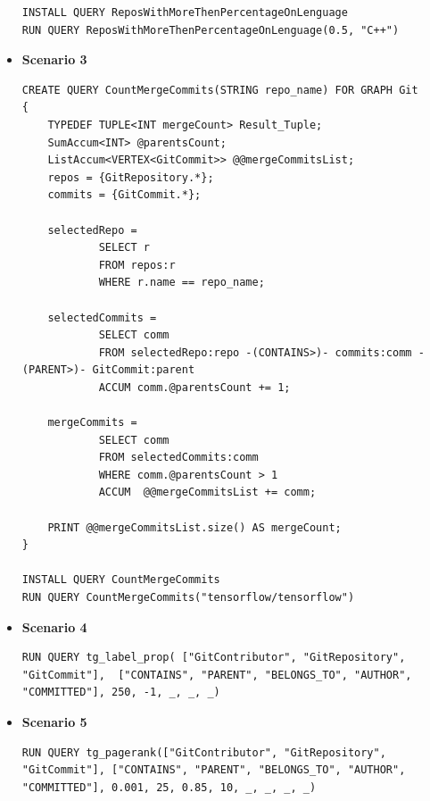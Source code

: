 \documentclass[11pt]{article}
\begin{document}
\begin{itemize}
\begin{lstlisting}[style = all, style=GSQLStyle]
INSTALL QUERY ReposWithMoreThenPercentageOnLenguage
RUN QUERY ReposWithMoreThenPercentageOnLenguage(0.5, "C++")
\end{lstlisting}
    \item \textbf{Scenario 3}
\begin{lstlisting}[style = all, style=GSQLStyle] 
CREATE QUERY CountMergeCommits(STRING repo_name) FOR GRAPH Git
{
    TYPEDEF TUPLE<INT mergeCount> Result_Tuple;
    SumAccum<INT> @parentsCount;
    ListAccum<VERTEX<GitCommit>> @@mergeCommitsList;
    repos = {GitRepository.*};
    commits = {GitCommit.*};

    selectedRepo =  
            SELECT r 
            FROM repos:r 
            WHERE r.name == repo_name;

    selectedCommits =   
            SELECT comm
            FROM selectedRepo:repo -(CONTAINS>)- commits:comm -(PARENT>)- GitCommit:parent
            ACCUM comm.@parentsCount += 1;

    mergeCommits = 
            SELECT comm
            FROM selectedCommits:comm
            WHERE comm.@parentsCount > 1
            ACCUM  @@mergeCommitsList += comm;
  
    PRINT @@mergeCommitsList.size() AS mergeCount;
}

INSTALL QUERY CountMergeCommits
RUN QUERY CountMergeCommits("tensorflow/tensorflow")
\end{lstlisting}
    \item \textbf{Scenario 4}
\begin{lstlisting}[style = all, style=GSQLStyle] 
RUN QUERY tg_label_prop( ["GitContributor", "GitRepository", "GitCommit"],  ["CONTAINS", "PARENT", "BELONGS_TO", "AUTHOR", "COMMITTED"], 250, -1, _, _, _)
\end{lstlisting}

    \item \textbf{Scenario 5}
\begin{lstlisting}[style = all, style=GSQLStyle] 
RUN QUERY tg_pagerank(["GitContributor", "GitRepository", "GitCommit"], ["CONTAINS", "PARENT", "BELONGS_TO", "AUTHOR", "COMMITTED"], 0.001, 25, 0.85, 10, _, _, _, _)
\end{lstlisting}
\end{itemize}



\newpage
\end{document}
